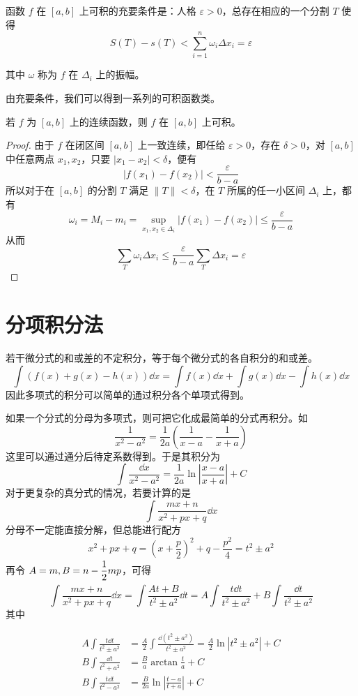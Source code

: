 \begin{theorem}
    函数 $f$ 在 $[a,b]$ 上可积的充要条件是：人格 $\varepsilon >0$，总存在相应的一个分割 $T$ 使得
    $$S(T) - s(T) < \sum_{i=1}^n\omega_i\Delta x_i = \varepsilon$$
\end{theorem}

其中 $\omega$ 称为 $f$ 在 $\Delta_i$ 上的振幅。

由充要条件，我们可以得到一系列的可积函数类。

\begin{theorem}
    若 $f$ 为 $[a,b]$ 上的连续函数，则 $f$ 在 $[a,b]$ 上可积。
\end{theorem}
\begin{proof}
    由于 $f$ 在闭区间 $[a,b]$ 上一致连续，即任给 $\varepsilon > 0$，存在 $\delta>0$，对 $[a,b]$ 中任意两点 $x_1,x_2$，只要 $|x_1-x_2|<\delta$，便有
    $$|f(x_1)-f(x_2)| < \frac{\varepsilon}{b-a}$$
    所以对于在 $[a,b]$ 的分割 $T$ 满足 $\|T\| < \delta$，在 $T$ 所属的任一小区间 $\Delta_i$ 上，都有
    $$\omega_i = M_i-m_i = \sup_{x_1,x_2\in\Delta_i}|f(x_1)-f(x_2)| \leqslant \frac{\varepsilon}{b-a}$$
    从而
    $$\sum_{T}\omega_i\Delta x_i \leqslant \frac{\varepsilon}{b-a}\sum_T\Delta x_i = \varepsilon$$
\end{proof}



\section{分项积分法}

若干微分式的和或差的不定积分，等于每个微分式的各自积分的和或差。
$$\int\left( f(x)+g(x)-h(x) \right)\dd x = \int f(x)\dd x + \int g(x)\dd x - \int h(x)\dd x$$
因此多项式的积分可以简单的通过积分各个单项式得到。

如果一个分式的分母为多项式，则可把它化成最简单的分式再积分。如
$$\frac{1}{x^2-a^2} = \frac{1}{2a}\left( \frac{1}{x-a}-\frac{1}{x+a} \right)$$
这里可以通过通分后待定系数得到。于是其积分为
$$\int \frac{\dd x}{x^2-a^2} = \frac{1}{2a}\ln\left|\frac{x-a}{x+a}\right|+C$$
对于更复杂的真分式的情况，若要计算的是
$$\int \frac{mx+n}{x^2+px+q} \dd x$$
分母不一定能直接分解，但总能进行配方
$$x^2+px+q = \left(x+\frac{p}{2}\right)^2+q-\frac{p^2}{4} = t^2 \pm a^2$$
再令 $A=m,B=n-\mfrac12mp$，可得
$$\int \frac{mx+n}{x^2+px+q} \dd x = \int \frac{At+B}{t^2 \pm a^2} \dd t 
= A\int \frac{t\dd t}{t^2 \pm a^2} + B\int \frac{\dd t}{t^2 \pm a^2}$$
其中

\begin{equation*}
    \begin{aligned}
        A\int \frac{t \dd t}{t^2 \pm a^2} &= \frac{A}{2}\int \frac{\dd(t^2 \pm a^2)}{t^2 \pm a^2} = \frac{A}{2} \ln|t^2 \pm a^2| +C \\
        B\int \frac{\dd t}{t^2 + a^2} &= \frac{B}{a}\arctan\frac{t}{a}+C \\
        B\int \frac{t \dd t}{t^2 - a^2} &= \frac{B}{2a}\ln\left|\frac{t-a}{t+a}\right|+C
    \end{aligned}
\end{equation*}

